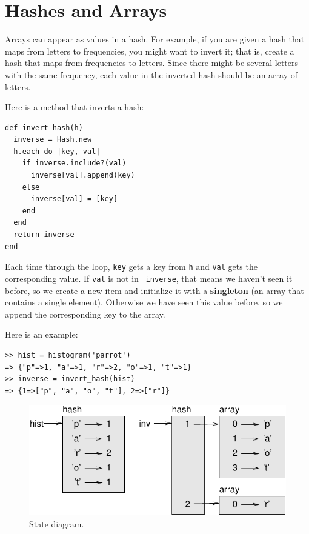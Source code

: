 \documentclass[10pt]{book}
\begin{document}
\section{Hashes and Arrays}
\label{invert}

Arrays can appear as values in a hash.  For example, if you
are given a hash that maps from letters to frequencies, you
might want to invert it; that is, create a hash that maps
from frequencies to letters.  Since there might be several letters
with the same frequency, each value in the inverted hash
should be an array of letters.

Here is a method that inverts a hash:

\begin{verbatim}
def invert_hash(h)
  inverse = Hash.new
  h.each do |key, val|
    if inverse.include?(val)
      inverse[val].append(key)
    else
      inverse[val] = [key]
    end
  end
  return inverse
end
\end{verbatim}
%
Each time through the loop, {\tt key} gets a key from {\tt h} and 
{\tt val} gets the corresponding value.  If {\tt val} is not in {\tt
  inverse}, that means we haven't seen it before, so we create a new
item and initialize it with a {\bf singleton} (an array that contains a
single element).  Otherwise we have seen this value before, so we
append the corresponding key to the array.

Here is an example:

\begin{verbatim}
>> hist = histogram('parrot')
=> {"p"=>1, "a"=>1, "r"=>2, "o"=>1, "t"=>1}
>> inverse = invert_hash(hist)
=> {1=>["p", "a", "o", "t"], 2=>["r"]}
\end{verbatim}

\begin{figure}
\centerline
{\includegraphics[scale=0.8]{figs/dict1.pdf}}
\caption{State diagram.}
\label{fig.dict1}
\end{figure}
\end{document}
